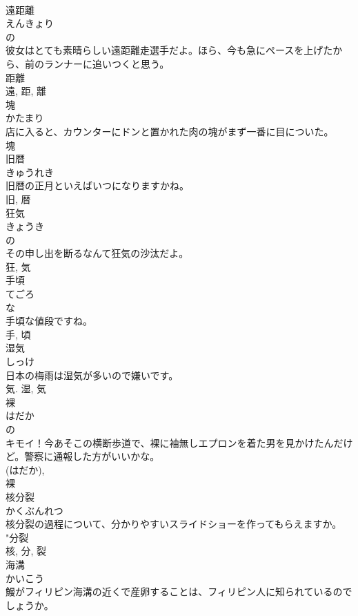 \documentclass[8pt]{extreport}
\begin{document}
\begin{CJK}{UTF8}{min}
\\	遠距離	
\\	えんきょり	
\\	の 
\\	彼女はとても素晴らしい遠距離走選手だよ。ほら、今も急にペースを上げたから、前のランナーに追いつくと思う。	
\\	距離 
\\	遠, 距, 離	
\\	塊	
\\	かたまり	
\\	店に入ると、カウンターにドンと置かれた肉の塊がまず一番に目についた。	
\\	塊	
\\	旧暦	
\\	きゅうれき	
\\	旧暦の正月といえばいつになりますかね。	
\\	旧, 暦	
\\	狂気	
\\	きょうき	
\\	の 
\\	その申し出を断るなんて狂気の沙汰だよ。	
\\	狂, 気	
\\	手頃	
\\	てごろ	
\\	な 
\\	手頃な値段ですね。	
\\	手, 頃	
\\	湿気	
\\	しっけ	
\\	日本の梅雨は湿気が多いので嫌いです。	
\\	気.	湿, 気	
\\	裸	
\\	はだか	
\\	の 
\\	キモイ！今あそこの横断歩道で、裸に袖無しエプロンを着た男を見かけたんだけど。警察に通報した方がいいかな。	
\\	(はだか), 
\\	裸	
\\	核分裂	
\\	かくぶんれつ	
\\	核分裂の過程について、分かりやすいスライドショーを作ってもらえますか。	
\\	"分裂 
\\	核, 分, 裂	
\\	海溝	
\\	かいこう	
\\	鰻がフィリピン海溝の近くで産卵することは、フィリピン人に知られているのでしょうか。	

\end{CJK}
\end{document}
